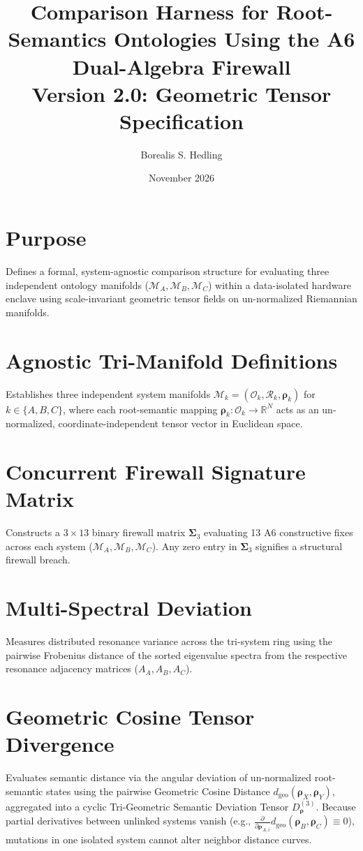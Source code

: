 \documentclass[11pt]{article}
\title{Comparison Harness for Root-Semantics Ontologies Using the A6 Dual-Algebra Firewall \\ \large Version 2.0: Geometric Tensor Specification}
\author{Borealis S. Hedling}
\date{November 2026}
\begin{document}
\maketitle

\section*{Purpose}
Defines a formal, system-agnostic comparison structure for evaluating three independent ontology manifolds ($\mathcal{M}_A, \mathcal{M}_B, \mathcal{M}_C$) within a data-isolated hardware enclave using scale-invariant geometric tensor fields on un-normalized Riemannian manifolds.

\section{Agnostic Tri-Manifold Definitions}
Establishes three independent system manifolds $\mathcal{M}_k = (\mathcal{O}_k, \mathcal{R}_k, \mathbf{\rho}_k)$ for $k \in \{A, B, C\}$, where each root-semantic mapping $\mathbf{\rho}_k: \mathcal{O}_k \to \mathbb{R}^N$ acts as an un-normalized, coordinate-independent tensor vector in Euclidean space.

\section{Concurrent Firewall Signature Matrix}
Constructs a $3 \times 13$ binary firewall matrix $\mathbf{\Sigma}_{3}$ evaluating 13 A6 constructive fixes across each system ($\mathcal{M}_A, \mathcal{M}_B, \mathcal{M}_C$). Any zero entry in $\mathbf{\Sigma}_{3}$ signifies a structural firewall breach.

\section{Multi-Spectral Deviation}
Measures distributed resonance variance across the tri-system ring using the pairwise Frobenius distance of the sorted eigenvalue spectra from the respective resonance adjacency matrices ($A_A, A_B, A_C$).

\section{Geometric Cosine Tensor Divergence}
Evaluates semantic distance via the angular deviation of un-normalized root-semantic states using the pairwise Geometric Cosine Distance $d_{\mathrm{geo}}(\mathbf{\rho}_X, \mathbf{\rho}_Y)$, aggregated into a cyclic Tri-Geometric Semantic Deviation Tensor $D_{\mathbf{\rho}}^{(3)}$. Because partial derivatives between unlinked systems vanish (e.g., $\frac{\partial}{\partial \mathbf{\rho}_{A,i}} d_{\mathrm{geo}}(\mathbf{\rho}_B, \mathbf{\rho}_C) \equiv 0$), mutations in one isolated system cannot alter neighbor distance curves.
\end{document}
